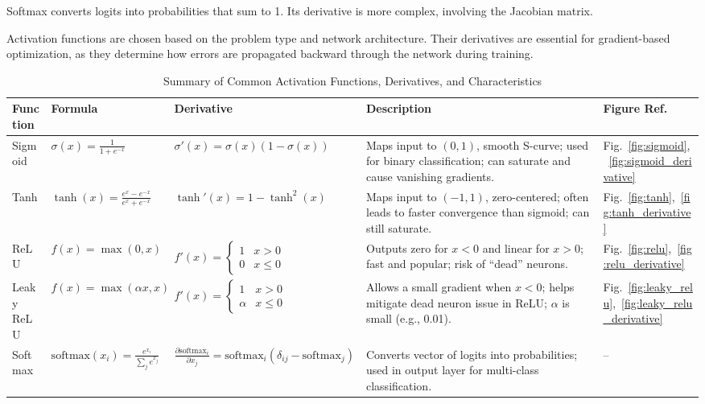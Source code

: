\documentclass[a4paper, journal]{IEEEtran}
\begin{document}
Softmax converts logits into probabilities that sum to 1. Its derivative is more complex, involving the Jacobian matrix.

Activation functions are chosen based on the problem type and network architecture. Their derivatives are essential for gradient-based optimization, as they determine how errors are propagated backward through the network during training.

\begin{table}[ht]
    \centering
    \caption{Summary of Common Activation Functions, Derivatives, and Characteristics}
    \begin{tabular}{@{}p{2.5cm}p{3.8cm}p{3.8cm}p{3.2cm}p{1.6cm}@{}}
        \toprule
        \textbf{Function} & \textbf{Formula} & \textbf{Derivative} & \textbf{Description} & \textbf{Figure Ref.} \\
        \midrule
        Sigmoid & $\sigma(x) = \frac{1}{1 + e^{-x}}$ & $\sigma'(x) = \sigma(x)(1-\sigma(x))$ & Maps input to $(0,1)$, smooth S-curve; used for binary classification; can saturate and cause vanishing gradients. & Fig.~\ref{fig:sigmoid},~\ref{fig:sigmoid_derivative} \\
        \midrule
        Tanh & $\tanh(x) = \frac{e^{x} - e^{-x}}{e^{x} + e^{-x}}$ & $\tanh'(x) = 1 - \tanh^2(x)$ & Maps input to $(-1,1)$, zero-centered; often leads to faster convergence than sigmoid; can still saturate. & Fig.~\ref{fig:tanh},~\ref{fig:tanh_derivative} \\
        \midrule
        ReLU & $f(x) = \max(0, x)$ & $f'(x) = \begin{cases} 1 & x > 0 \\ 0 & x \leq 0 \end{cases}$ & Outputs zero for $x < 0$ and linear for $x > 0$; fast and popular; risk of “dead” neurons. & Fig.~\ref{fig:relu},~\ref{fig:relu_derivative} \\
        \midrule
        Leaky ReLU & $f(x) = \max(\alpha x, x)$ & $f'(x) = \begin{cases} 1 & x > 0 \\ \alpha & x \leq 0 \end{cases}$ & Allows a small gradient when $x < 0$; helps mitigate dead neuron issue in ReLU; $\alpha$ is small (e.g., 0.01). & Fig.~\ref{fig:leaky_relu},~\ref{fig:leaky_relu_derivative} \\
        \midrule
        Softmax & $\mathrm{softmax}(x_i) = \frac{e^{x_i}}{\sum_j e^{x_j}}$ & $\frac{\partial \mathrm{softmax}_i}{\partial x_j} = \mathrm{softmax}_i (\delta_{ij} - \mathrm{softmax}_j)$ & Converts vector of logits into probabilities; used in output layer for multi-class classification. & -- \\
        \bottomrule
    \end{tabular}
\end{table}
\end{document}
